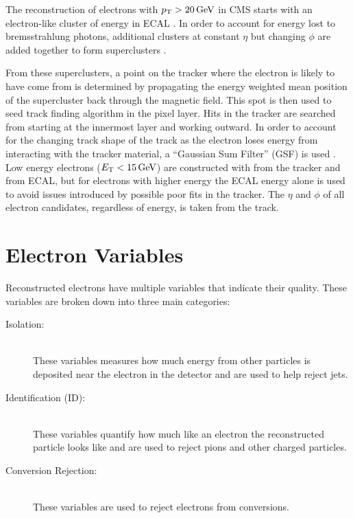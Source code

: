 The reconstruction of electrons with $p_{\mathrm{T}} > 20 \,\text{Ge\hspace{-.08em}V}$ in CMS starts with an
electron-like cluster of energy in ECAL \cite{eg_reco_2010}. In order to
account for energy lost to bremsstrahlung photons, additional clusters at
constant $\eta$ but changing $\phi$ are added together to form superclusters
\cite{baffioni_2007}.

From these superclusters, a point on the tracker where the electron is likely
to have come from is determined by propagating the energy weighted mean
position of the supercluster back through the magnetic field. This spot is then
used to seed  track finding algorithm in the pixel layer. Hits in the tracker
are searched from starting at the innermost layer and working outward. In order
to account for the changing track shape of the track as the electron loses
energy from interacting with the tracker material, a ``Gaussian Sum Filter''
(GSF) is used \cite{adam_2005}. Low energy electrons ($E_{\mathrm{T}} < 15 \,\text{Ge\hspace{-.08em}V}$) are
constructed with \pt from the tracker and \ET from ECAL, but for electrons with
higher energy the ECAL energy alone is used to avoid issues introduced by
possible poor fits in the tracker. The $\eta$ and $\phi$ of all electron
candidates, regardless of energy, is taken from the track.

\section{Electron Variables}
\label{sec:electron_variables}

Reconstructed electrons have multiple variables that indicate their quality.
These variables are broken down into three main categories:

\begin{description}
    \item[Isolation:] \hfill \\
        These variables measures how much energy from other particles is
        deposited near the electron in the detector and are used to help reject
        jets.
    \item[Identification (ID):] \hfill \\
        These variables quantify how much like an electron the reconstructed
        particle looks like and are used to reject pions and other charged
        particles.
    \item[Conversion Rejection:] \hfill \\
        These variables are used to reject electrons from \photontoee
        conversions.
\end{description}

